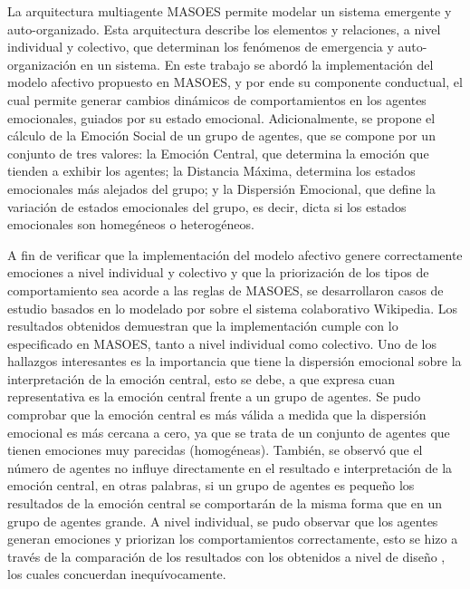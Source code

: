 %
%
%


La arquitectura multiagente MASOES permite modelar un sistema emergente
y auto-organizado. Esta arquitectura
describe los elementos y relaciones, a nivel individual y colectivo, que
determinan los fenómenos de emergencia y auto-organización en un sistema.
En este trabajo se abordó la implementación del modelo afectivo
propuesto en MASOES, y por ende su componente conductual,
el cual permite generar cambios dinámicos de comportamientos en los
agentes emocionales, guiados por su estado emocional.
Adicionalmente, se propone el cálculo de
la Emoción Social de un grupo de agentes,
que se compone por un conjunto de tres valores: la Emoción Central,
que determina la emoción que tienden a exhibir los agentes;
la Distancia Máxima, determina los estados emocionales más alejados del grupo;
y la Dispersión Emocional, que define la variación de estados emocionales del grupo,
es decir, dicta si los estados emocionales son homegéneos o heterogéneos.

A fin de verificar que la implementación del modelo afectivo genere correctamente emociones a nivel individual y colectivo
y que la priorización de los tipos de comportamiento sea acorde a las reglas de MASOES,
se desarrollaron casos de estudio
basados en lo modelado por \cite{perozo2012} sobre el sistema colaborativo Wikipedia.
Los resultados obtenidos demuestran que la implementación cumple
con lo especificado en MASOES, tanto a nivel individual como colectivo.
Uno de los hallazgos interesantes es la importancia que tiene la dispersión emocional
sobre la interpretación de la emoción central, esto se debe, a que
expresa cuan representativa es la emoción central frente a un grupo de agentes.
Se pudo comprobar que la emoción central es más válida a medida que la dispersión
emocional es más cercana a cero, ya que se trata de un conjunto de agentes que tienen emociones muy parecidas (homogéneas).
También, se observó que el número de agentes no influye directamente en el resultado
e interpretación de la emoción central, en otras palabras, si un grupo de agentes
es pequeño los resultados de la emoción central se comportarán de la misma forma que en
un grupo de agentes grande.
A nivel individual,
se pudo observar que los agentes generan emociones y priorizan los comportamientos
correctamente, esto se hizo a través de la comparación de los resultados
con los obtenidos a nivel de diseño \citep{perozo2012}, los cuales concuerdan inequívocamente.

